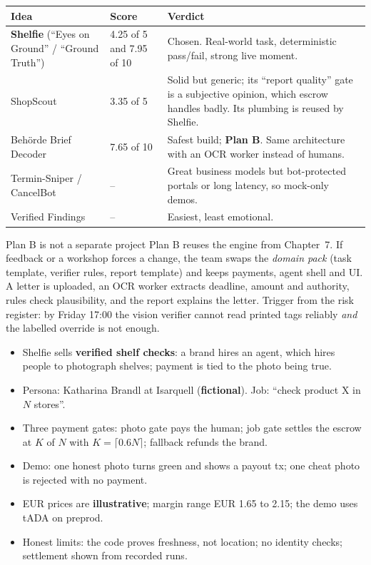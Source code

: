 \begin{center}
\small
\begin{tabularx}{\textwidth}{@{}p{3.2cm}p{2.6cm}X@{}}
\toprule
\textbf{Idea} & \textbf{Score} & \textbf{Verdict}\\
\midrule
\textbf{Shelfie} (``Eyes on Ground'' / ``Ground Truth'') & 4.25 of 5 and 7.95 of 10 & Chosen. Real-world task, deterministic pass/fail, strong live moment.\\
ShopScout & 3.35 of 5 & Solid but generic; its ``report quality'' gate is a subjective opinion, which escrow handles badly. Its plumbing is reused by Shelfie.\\
Beh\"orde Brief Decoder & 7.65 of 10 & Safest build; \textbf{Plan B}. Same architecture with an OCR worker instead of humans.\\
Termin-Sniper / CancelBot & -- & Great business models but bot-protected portals or long latency, so mock-only demos.\\
Verified Findings & -- & Easiest, least emotional.\\
\bottomrule
\end{tabularx}
\end{center}

\begin{conceptbox}{Plan B is not a separate project}
Plan B reuses the engine from Chapter~7. If feedback or a workshop forces a change, the team swaps the \emph{domain pack} (task template, verifier rules, report template) and keeps payments, agent shell and UI. A letter is uploaded, an OCR worker extracts deadline, amount and authority, rules check plausibility, and the report explains the letter. Trigger from the risk register: by Friday 17:00 the vision verifier cannot read printed tags reliably \emph{and} the labelled override is not enough.
\end{conceptbox}

\begin{keypoints}
\begin{itemize}
  \item Shelfie sells \textbf{verified shelf checks}: a brand hires an agent, which hires people to photograph shelves; payment is tied to the photo being true.
  \item Persona: Katharina Brandl at Isarquell (\textbf{fictional}). Job: ``check product X in $N$ stores''.
  \item Three payment gates: photo gate pays the human; job gate settles the escrow at $K$ of $N$ with $K=\lceil 0.6N\rceil$; fallback refunds the brand.
  \item Demo: one honest photo turns green and shows a payout tx; one cheat photo is rejected with no payment.
  \item EUR prices are \textbf{illustrative}; margin range EUR 1.65 to 2.15; the demo uses tADA on preprod.
  \item Honest limits: the code proves freshness, not location; no identity checks; settlement shown from recorded runs.
\end{itemize}
\end{keypoints}

